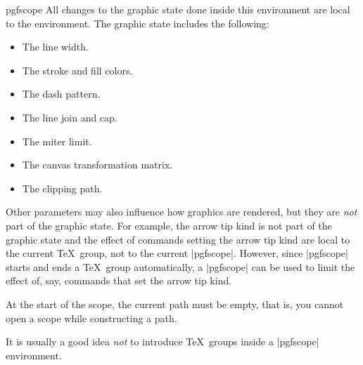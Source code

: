 \begin{environment}{{pgfscope}}
    All changes to the graphic state done inside this environment are
    local to the environment. The graphic state includes the following:
    \begin{itemize}
        \item The line width.
        \item The stroke and fill colors.
        \item The dash pattern.
        \item The line join and cap.
        \item The miter limit.
        \item The canvas transformation matrix.
        \item The clipping path.
    \end{itemize}
    Other parameters may also influence how graphics are rendered, but they are
    \emph{not} part of the graphic state. For example, the arrow tip kind is
    not part of the graphic state and the effect of commands setting the arrow
    tip kind are local to the current \TeX\ group, not to the current
    |{pgfscope}|. However, since |{pgfscope}| starts and ends a \TeX\ group
    automatically, a |{pgfscope}| can be used to limit the effect of, say,
    commands that set the arrow tip kind.
\begin{codeexample}[]
\begin{pgfpicture}
  \begin{pgfscope}
    {
      \pgfsetlinewidth{2pt}
      \pgfpathrectangle{\pgfpointorigin}{\pgfpoint{2ex}{2ex}}
    }
    \pgfpathrectangle{\pgfpoint{3ex}{0ex}}{\pgfpoint{2ex}{2ex}}
  \end{pgfscope}
  \pgfpathrectangle{\pgfpoint{6ex}{0ex}}{\pgfpoint{2ex}{2ex}}
\end{pgfpicture}
\end{codeexample}

\begin{codeexample}[]
\begin{pgfpicture}
  \begin{pgfscope}
    {
      \pgfsetarrows{->}
      \pgfpathmoveto{\pgfpointorigin}\pgfpathlineto{\pgfpoint{2ex}{2ex}}
    }
    \pgfpathmoveto{\pgfpoint{3ex}{0ex}}\pgfpathlineto{\pgfpoint{5ex}{2ex}}
  \end{pgfscope}
  \pgfpathmoveto{\pgfpoint{6ex}{0ex}}\pgfpathlineto{\pgfpoint{8ex}{2ex}}
\end{pgfpicture}
\end{codeexample}

    At the start of the scope, the current path must be empty, that is, you
    cannot open a scope while constructing a path.

    It is usually a good idea \emph{not} to introduce \TeX\ groups inside a
    |{pgfscope}| environment.
\end{environment}

